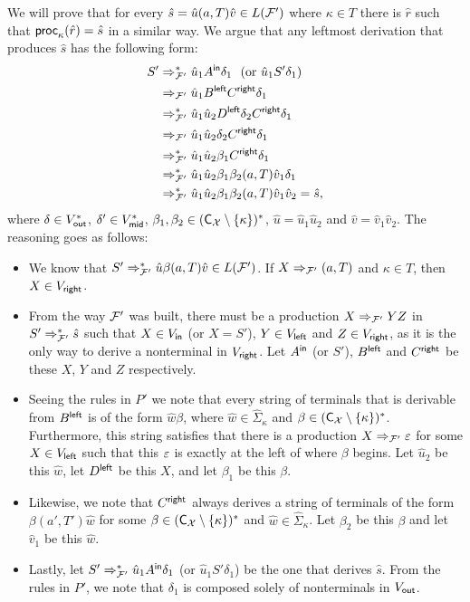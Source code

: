 We will prove that for every $\hat{s} = \hat{u}(a, T)\hat{v}\in L(\mathcal{F}')$ where $\kappa\in T$ there is $\hat{r}$ such that $\mathsf{proc}_\kappa(\hat{r}) = \hat{s}$ in a similar way. We argue that any leftmost derivation that produces $\hat{s}$ has the following form:
\begin{align*}
	S'  &\Rightarrow_{\mathcal{F}'}^* 
	\hat{u}_1 A^{\mathsf{in}} \delta_1\ \  (\text{or } \hat{u}_1 S' \delta_1)\\
	&\Rightarrow_{\mathcal{F}'} 
	\hat{u}_1 B^{\mathsf{left}} C^{\mathsf{right}} \delta_1\\
	&\Rightarrow_{\mathcal{F}'}^* 
	\hat{u}_1 \hat{u}_2 D^{\mathsf{left}} \delta_2 C^{\mathsf{right}} \delta_1 \\
	&\Rightarrow_{\mathcal{F}'}
	\hat{u}_1 \hat{u}_2 \delta_2 C^{\mathsf{right}} \delta_1 \\
	&\Rightarrow_{\mathcal{F}'}^* 
	\hat{u}_1 \hat{u}_2 \beta_1 C^{\mathsf{right}} \delta_1 \\
	&\Rightarrow_{\mathcal{F}'}^*
	\hat{u}_1 \hat{u}_2 \beta_1 \beta_2 (a, T) \hat{v}_1 \delta_1 \\
	&\Rightarrow_{\mathcal{F}'}^* 
	\hat{u}_1 \hat{u}_2 \beta_1 \beta_2 (a, T) \hat{v}_1 \hat{v}_2 = \hat{s},
\end{align*}
where $\delta\in V_{\mathsf{out}}^*$, $\delta'\in V_{\mathsf{mid}}^*$, $\beta_1,\beta_2\in (\textsf{C}_{\mathcal{X}}\setminus\{\kappa\})^*$, $\hat{u} = \hat{u}_1\hat{u}_2$ and $\hat{v} = \hat{v}_1\hat{v}_2$. The reasoning goes as follows:
\begin{itemize}
	\item We know that $S'\Rightarrow_{\mathcal{F}'}^*\hat{u}\beta(a, T)\hat{v}\in L(\mathcal{F}')$. If $X\Rightarrow_{\mathcal{F}'}(a, T)$ and $\kappa\in T$, then $X\in V_{\mathsf{right}}$.
	\item From the way $\mathcal{F}'$ was built, there must be a production $X\Rightarrow_{\mathcal{F}'} YZ$ in $S'\Rightarrow_{\mathcal{F}'}^*\hat{s}$ such that $X\in V_{\mathsf{in}}$ (or $X = S'$), $Y\in V_{\mathsf{left}}$ and $Z\in V_{\mathsf{right}}$, as it is the only way to derive a nonterminal in $V_{\mathsf{right}}$. Let $A^{\mathsf{in}}$ (or $S'$), $B^{\mathsf{left}}$ and $C^{\mathsf{right}}$ be these $X$, $Y$ and $Z$ respectively.
	\item Seeing the rules in $P'$ we note that every string of terminals that is derivable from $B^{\mathsf{left}}$ is of the form $\hat{w}\beta$, where $\hat{w}\in\hat{\Sigma}_\kappa$ and $\beta\in (\textsf{C}_{\mathcal{X}}\setminus\{\kappa\})^*$. Furthermore, this string satisfies that there is a production $X\Rightarrow_{\mathcal{F}'}\varepsilon$ for some $X\in V_{\mathsf{left}}$ such that this $\varepsilon$ is exactly at the left of where $\beta$ begins. Let $\hat{u}_2$ be this $\hat{w}$, let $D^{\mathsf{left}}$ be this $X$, and let $\beta_1$ be this $\beta$.
	\item Likewise, we note that $C^{\mathsf{right}}$ always derives a string of terminals of the form $\beta(a', T')\hat{w}$ for some $\beta\in (\textsf{C}_{\mathcal{X}}\setminus\{\kappa\})^*$ and $\hat{w}\in\hat{\Sigma}_\kappa$. Let $\beta_2$ be this $\beta$ and let $\hat{v}_1$ be this $\hat{w}$.
	\item Lastly, let $S' \Rightarrow_{\mathcal{F}'}^* \hat{u}_1 A^{\mathsf{in}} \delta_1$ (or $\hat{u}_1 S' \delta_1$) be the one that derives $\hat{s}$. From the rules in $P'$, we note that $\delta_1$ is composed solely of nonterminals in $V_{\mathsf{out}}$.
\end{itemize}


